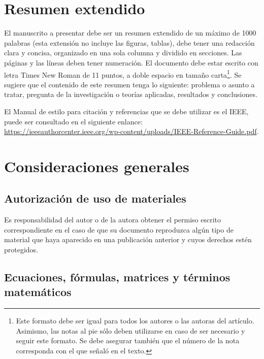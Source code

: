 \documentclass{jornadas}
\begin{document}

\titulos

\listadeautores

\palabrasclave

\linenumbers

\section{Resumen extendido}

El manuscrito a presentar debe ser un resumen extendido de un máximo de 1000 palabras (esta extensión no incluye las figuras, tablas), debe tener una redacción clara y concisa, organizado en una sola columna y dividido en secciones. Las páginas y las líneas deben tener numeración. El documento debe estar escrito con letra Times New Roman de 11 puntos, a doble espacio en tamaño carta\footnote{Este formato debe ser igual para todos los autores o las autoras del artículo. Asimismo, las notas al pie sólo deben utilizarse en caso de ser necesario y seguir este formato. Se debe asegurar también que el número de la nota corresponda con el que señaló en el texto.}. Se sugiere que el contenido de este resumen tenga lo siguiente:  problema o asunto a tratar, pregunta de la investigación o teorías aplicadas, resultados y conclusiones.

El Manual de estilo para citación y referencias que se debe utilizar es el IEEE, puede ser consultado en el siguiente enlance: \url{https://ieeeauthorcenter.ieee.org/wp-content/uploads/IEEE-Reference-Guide.pdf}.

\section{Consideraciones generales}

\subsection{Autorización de uso de materiales}

Es responsabilidad del autor o de la autora obtener el permiso escrito correspondiente en el caso de que su documento reproduzca algún tipo de material que haya aparecido en una publicación anterior y cuyos derechos estén protegidos.

\subsection{Ecuaciones, fórmulas, matrices y términos matemáticos}
\end{document}
